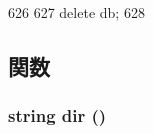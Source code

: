 \begin{DoxyCode}
626 {
627     delete db;
628 }
\end{DoxyCode}


\subsection{関数}
\hypertarget{classCheckpoint_af15f18c4fe6e8c7fe6e0bcdb3d007d96}{
\subsubsection[{dir}]{\setlength{\rightskip}{0pt plus 5cm}string dir ()}}
\label{classCheckpoint_af15f18c4fe6e8c7fe6e0bcdb3d007d96}



